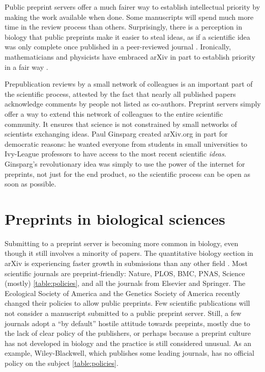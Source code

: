\documentclass[letterpaper,twocolumn,superscriptaddress,showkeys]{revtex4-1}
\begin{document}
Public preprint servers offer a much fairer way to establish intellectual
priority by making the work available when done. Some manuscripts will spend
much more time in the review process than others. Surprisingly, there is a
perception in biology that public preprints make it easier to steal ideas, as if
a scientific idea was only complete once published in a peer-reviewed journal
\cite{gin11}. Ironically, mathematicians and physicists have embraced arXiv in
part to establish priority in a fair way \cite{gin11,cal12}.

Prepublication reviews by a small network of colleagues is an important part of
the scientific process, attested by the fact that nearly all published papers
acknowledge comments by people not listed as co-authors.  Preprint servers
simply offer a way to extend this network of colleagues to the entire scientific
community. It ensures that science is not constrained by small networks of
scientists exchanging ideas.  Paul Ginsparg created arXiv.org in part for
democratic reasons: he wanted everyone from students in small universities to
Ivy-League professors to have access to the most recent scientific \emph{ideas}.
Ginsparg's revolutionary idea was simply to use the power of the internet for
preprints, not just for the end product, so the scientific process can be open
as soon as possible.

\section{Preprints in biological sciences}

Submitting to a preprint server is becoming more common in biology, even though
it still involves a minority of papers. The quantitative biology section in
arXiv is experiencing faster growth in submissions than any other field
\cite{cal12}. Most scientific journals are preprint-friendly: Nature, PLOS, BMC,
PNAS, Science (mostly) \ref{table:policies}, and all the journals from Elsevier
and Springer.  The Ecological Society of America and the Genetics Society of
America recently changed their policies to allow public preprints.  Few
scientific publications will not consider a manuscript submitted to a public
preprint server.  Still, a few journals adopt a ``by default'' hostile attitude
towards preprints, mostly due to the lack of clear policy of the publishers, or
perhaps because a preprint culture has not developed in biology and the practice
is still considered unusual. As an example, Wiley-Blackwell, which publishes
some leading journals, has no official policy on the subject
\ref{table:policies}.
\end{document}
